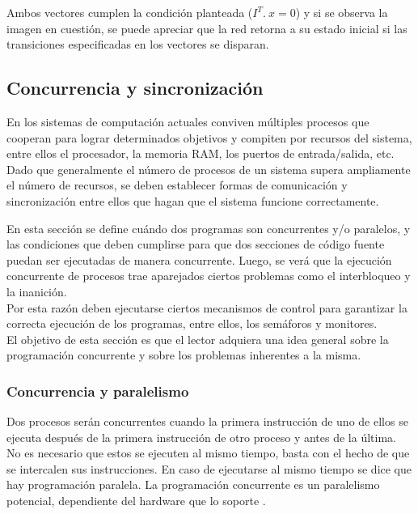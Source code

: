 Ambos vectores cumplen la condición planteada ($I^T .\ x = 0$) y si se observa la imagen en cuestión, se puede apreciar que la red retorna a su estado inicial si las transiciones especificadas en los vectores se disparan.

\subsection{Concurrencia y sincronización}
En los sistemas de computación actuales conviven múltiples procesos que cooperan para lograr determinados objetivos y compiten por recursos del sistema, entre ellos el procesador, la memoria RAM, los puertos de entrada/salida, etc.\\
Dado que generalmente el número de procesos de un sistema supera ampliamente el número de recursos, se deben establecer formas de comunicación y sincronización entre ellos que hagan que el sistema funcione correctamente. 

\par En esta sección se define cuándo dos programas son concurrentes y/o paralelos, y las condiciones que deben cumplirse para que dos secciones de código fuente puedan ser ejecutadas de manera concurrente. Luego, se verá que la ejecución concurrente de procesos trae aparejados ciertos problemas como el interbloqueo y la inanición.\\
Por esta razón deben ejecutarse ciertos mecanismos de control para garantizar la correcta ejecución de los programas, entre ellos, los semáforos y monitores.\\
El objetivo de esta sección es que el lector adquiera una idea general sobre la programación concurrente y sobre los problemas inherentes a la misma.

\subsubsection{Concurrencia y paralelismo}
Dos procesos serán concurrentes cuando la primera instrucción de uno de ellos se ejecuta después de la primera instrucción de otro proceso y antes de la última.
No es necesario que estos se ejecuten al mismo tiempo, basta con el hecho de que se intercalen sus instrucciones. En caso de ejecutarse al mismo tiempo se dice que hay programación paralela.
La programación concurrente es un paralelismo potencial, dependiente del hardware que lo soporte  \cite{mendez}.

